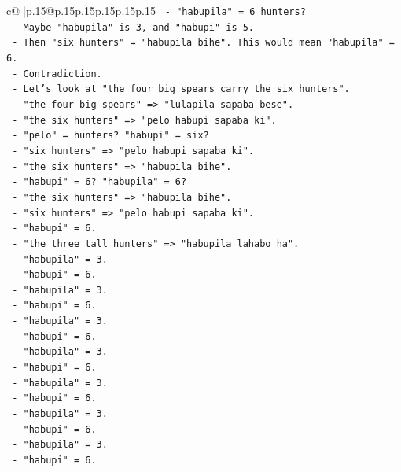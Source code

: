 \documentclass{article}
\begin{document}
{\begin{supertabular}{c@{$\;$}|p{.15\linewidth}@{}p{.15\linewidth}p{.15\linewidth}p{.15\linewidth}p{.15\linewidth}p{.15\linewidth}}
{{{\texttt{       {-} "habupila" = 6 hunters?} \\
\texttt{       {-} Maybe "habupila" is 3, and "habupi" is 5.} \\
\texttt{       {-} Then "six hunters" = "habupila bihe". This would mean "habupila" = 6.} \\
\texttt{       {-} Contradiction.} \\
\texttt{       {-} Let's look at "the four big spears carry the six hunters".} \\
\texttt{       {-} "the four big spears" => "lulapila sapaba bese".} \\
\texttt{       {-} "the six hunters" => "pelo habupi sapaba ki".} \\
\texttt{       {-} "pelo" = hunters? "habupi" = six?} \\
\texttt{       {-} "six hunters" => "pelo habupi sapaba ki".} \\
\texttt{       {-} "the six hunters" => "habupila bihe".} \\
\texttt{       {-} "habupi" = 6? "habupila" = 6?} \\
\texttt{       {-} "the six hunters" => "habupila bihe".} \\
\texttt{       {-} "six hunters" => "pelo habupi sapaba ki".} \\
\texttt{       {-} "habupi" = 6.} \\
\texttt{       {-} "the three tall hunters" => "habupila lahabo ha".} \\
\texttt{       {-} "habupila" = 3.} \\
\texttt{       {-} "habupi" = 6.} \\
\texttt{       {-} "habupila" = 3.} \\
\texttt{       {-} "habupi" = 6.} \\
\texttt{       {-} "habupila" = 3.} \\
\texttt{       {-} "habupi" = 6.} \\
\texttt{       {-} "habupila" = 3.} \\
\texttt{       {-} "habupi" = 6.} \\
\texttt{       {-} "habupila" = 3.} \\
\texttt{       {-} "habupi" = 6.} \\
\texttt{       {-} "habupila" = 3.} \\
\texttt{       {-} "habupi" = 6.} \\
\texttt{       {-} "habupila" = 3.} \\
\texttt{       {-} "habupi" = 6.} \\
}}}
\end{supertabular}}
\end{document}
